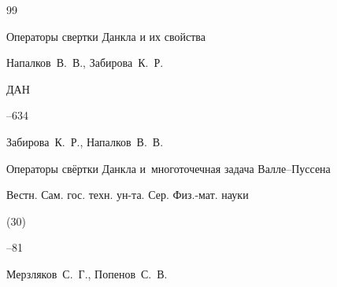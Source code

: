 \begin{thebibliography}{99}
















\paper Операторы свертки Данкла и их свойства

\by Напалков~В.~В., Забирова~К.~Р.

\jour ДАН




--634





\by Забирова~К.~Р., Напалков~В.~В.

\paper Операторы свёртки Данкла и~многоточечная задача Валле--Пуссена

\jour Вестн. Сам. гос. техн. ун-та. Сер. Физ.-мат. науки


(30)

--81






\by Мерзляков~С.~Г., Попенов~С.~В.


\end{thebibliography}

